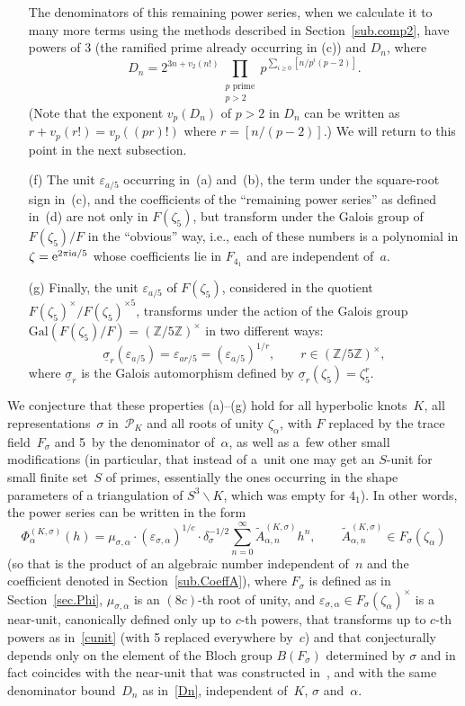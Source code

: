 \documentclass[pdftex]{sigma}
\numberwithin{equation}{section}
\def\calP{\mathcal P}
\def\calP{\mathcal P}
\def\wt{\widetilde}
\def\z{\zeta}
\def\a{\alpha}
\def\Z{\mathbb Z}
\def\a{\alpha}
\def\z{\zeta}
\def\s{\sigma}
\def\be{\begin{equation}}
\def\ee{\end{equation}}
\def\ve{\varepsilon}
\def\ssm{\smallsetminus}
\def\tiA{\wt A}
\def\ul{\underline}
\begin{document}
\begin{itemize}
 The denominators of this remaining power series, when we calculate it to many more
 terms using the methods described in Section~\ref{sub.comp2}, have powers of $3$
 (the ramified prime already occurring in (c)) and $D_n$, where
\be
\label{Dn}
D_n = 2^{3n + v_2(n!)} \prod_{\substack{\text{$p$ prime} \\ p>2}}
 p^{ \sum_{i\ge0}[n/p^i(p-2)]} .
\ee
(Note that the exponent $v_p(D_n)$ of $p >2$ in $D_n$ can be written
as $r+v_p(r!) = v_p((p r)!)$ where $r=[n/(p-2)]$.) We will
return to this point in the next subsection.
\item[(f)]
 The unit $\ve_{a/5}$ occurring in~(a) and~(b), the term under the square-root sign
 in~(c), and the coefficients of the ``remaining power series'' as defined in~(d) are
 not only in $F(\z_5)$, but transform under the Galois group
 \smash{$\{\z\mapsto\z^r\}_{5\nmid r}$} of $F(\z_5)/F$ in the ``obvious'' way, i.e., each of
 these numbers is a polynomial in $\z={\rm e}^{2\pi{\rm i}a/5}$ whose coefficients lie in $F_{4_1}$
 and are independent of~$a$.
\item[(g)]
 Finally, the unit $\ve_{a/5}$ of $F(\z_5)$, considered in the quotient
 $F(\z_5)^\times/F(\z_5)^{\times 5}$, transforms under the action of the Galois
 group~$ \text{Gal}(F(\z_5)/F)=(\Z/5\Z)^\times$ in two different ways:
\be
\label{cunit}
\ul\s_r(\ve_{a/5}) = \ve_{ar/5} = (\ve_{a/5})^{1/r}, \qquad r\in(\Z/5\Z)^\times,
\ee
where $\ul\s_r$ is the Galois automorphism defined by $\ul\s_r(\z_5)=\z_5^{ r}$.
\end{itemize}

We conjecture that these properties (a)--(g) hold for all hyperbolic knots~$K$, all
representations~$\s$ in~$\calP_K$ and all roots of unity $\z_\a$, with $F$ replaced
by the trace field~$F_\s$ and 5~by the denominator of~$\a$, as well as a~few other
small modifications (in particular, that instead of a~unit one may get an $S$-unit
for small finite set~$S$ of primes, essentially the ones occurring in the shape
parameters of a triangulation of $S^3\ssm K$, which was empty for $4_1$). In other
words, the power series \smash{$\Phi^{(K,\s)}_{\a}(h)$} can be written in the form
\be
\label{Phiprec2}
\Phi_\a^{(K,\s)}(h) =\mu_{\s,\a}\cdot(\ve_{\s,\a})^{1/c}
\cdot \delta_\s^{-1/2} \sum_{n=0}^\infty \tiA^{(K,\s)}_{\a,n} h^n ,
\qquad \tiA^{(K,\s)}_{\a,n} \in F_\s(\z_\a)
\ee
(so that \smash{$\tiA^{(K,\s)}_{\a,n}$} is the product of an algebraic number independent of~$n$
and the coefficient denoted \smash{$A^{(K,\s)}_\a(n)$} in Section~\ref{sub.CoeffA}),
where $F_\s$ is defined as in Section~\ref{sec.Phi}, $\mu_{\s,\a}$ is an $(8c)$-th root
of unity, and $\ve_{\s,\a} \in F_\s(\z_\a)^\times$ is a near-unit, canonically defined only
up to $c$-th powers, that transforms up to $c$-th powers as in~\eqref{cunit} (with 5
replaced everywhere by~$c$) and that conjecturally depends only on the element of the
Bloch group $B(F_\s)$ determined by $\s$ and in fact coincides with the near-unit that
was constructed in~\cite{CGZ}, and with the same denominator bound~$D_n$ as
in~\eqref{Dn}, independent of~$K$, $\s$ and~$\a$.
\end{document}
